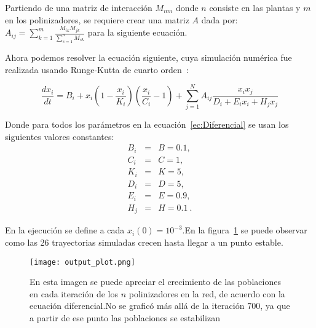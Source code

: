 \documentclass[11pt]{article}
\begin{document}
Partiendo de una matriz de interacción $M_{nm}$ donde $n$ consiste en las plantas y $m$ en los polinizadores, se requiere crear una matriz $A$ dada por: $
A_{ij}=\sum^m_{k=1}\frac{M_{ik}M_{jk}}{\sum^n_{s=1}M_{sk}}
$ para la siguiente ecuación.

Ahora podemos resolver la ecuación siguiente, cuya simulación numérica fue realizada usando Runge-Kutta de cuarto orden~\cite{numerical2002recipes}:

\begin{equation}
\label{ec:Diferencial}
\frac{dx_i}{dt} = B_{i}+x_{i}\left( 1-\frac{x_{i}}{K_{i}}\right ) \left(\frac{x_{i}}{C_{i}}-1\right)+\sum^N_{j=1}A_{ij}\frac{x_{i}x_{j}}{D_{i}+E_{i}x_{i}+H_{j}x_{j}}
\end{equation}


Donde para todos los parámetros en la ecuación~\eqref{ec:Diferencial} se usan los siguientes valores constantes:
\begin{eqnarray*}
B_{i}&=&B=0.1,\\
C_{i}&=&C=1,\\
K_{i}&=&K=5,\\ 
D_{i}&=&D=5,\\
E_{i}&=&E=0.9,\\
H_{j}&=&H=0.1\ .
\end{eqnarray*}

En la ejecución se define a cada $x_{i}(0)=10^{-3}$.En la figura~\ref{fig-sol} se puede observar como las 26 trayectorias simuladas crecen hasta llegar a un punto estable.

\begin{figure}[hb]
\label{fig-sol}
\texttt{[image: output\_plot.png]}
\caption{En esta imagen se puede apreciar el crecimiento de las poblaciones en cada iteración de los $n$ polinizadores en la red, de acuerdo con la ecuación diferencial.No se graficó más allá de la iteración 700, ya que a partir de ese punto las poblaciones se estabilizan}
\end{figure}

        

 
\end{document}
